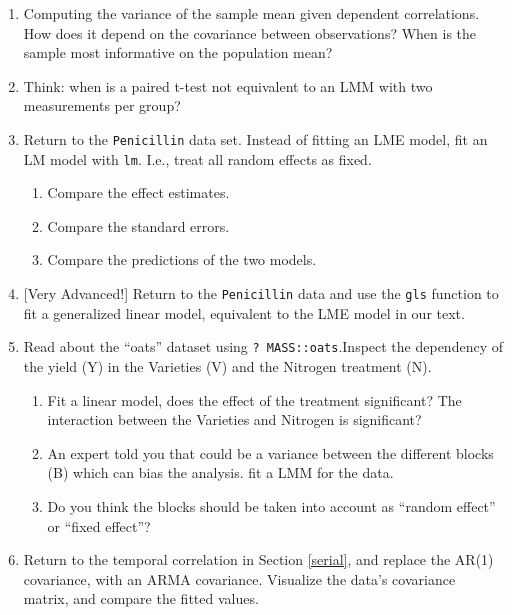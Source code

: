 \documentclass[]{book}
\providecommand{\tightlist}{%
  \setlength{\itemsep}{0pt}\setlength{\parskip}{0pt}}
\theoremstyle{definition}
\theoremstyle{definition}
\theoremstyle{definition}
\theoremstyle{remark}
\begin{document}
\begin{enumerate}
\def\labelenumi{\arabic{enumi}.}
\item
  Computing the variance of the sample mean given dependent correlations. How does it depend on the covariance between observations? When is the sample most informative on the population mean?
\item
  Think: when is a paired t-test not equivalent to an LMM with two measurements per group?
\item
  Return to the \texttt{Penicillin} data set. Instead of fitting an LME model, fit an LM model with \texttt{lm}. I.e., treat all random effects as fixed.

  \begin{enumerate}
  \def\labelenumii{\alph{enumii}.}
  \tightlist
  \item
    Compare the effect estimates.
  \item
    Compare the standard errors.
  \item
    Compare the predictions of the two models.
  \end{enumerate}
\item
  {[}Very Advanced!{]} Return to the \texttt{Penicillin} data and use the \texttt{gls} function to fit a generalized linear model, equivalent to the LME model in our text.
\item
  Read about the ``oats'' dataset using \texttt{?\ MASS::oats}.Inspect the dependency of the yield (Y) in the Varieties (V) and the Nitrogen treatment (N).

  \begin{enumerate}
  \def\labelenumii{\arabic{enumii}.}
  \tightlist
  \item
    Fit a linear model, does the effect of the treatment significant? The interaction between the Varieties and Nitrogen is significant?
  \item
    An expert told you that could be a variance between the different blocks (B) which can bias the analysis. fit a LMM for the data.
  \item
    Do you think the blocks should be taken into account as ``random effect'' or ``fixed effect''?
  \end{enumerate}
\item
  Return to the temporal correlation in Section \ref{serial}, and replace the AR(1) covariance, with an ARMA covariance. Visualize the data's covariance matrix, and compare the fitted values.
\end{enumerate}
\end{document}
